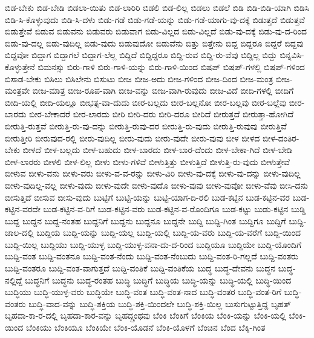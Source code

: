 {ಬಿಡ-ಬೇಕು
ಬಿಡ-ಬೇಡಿ
ಬಿಡಲಾ-ಯಿತು
ಬಿಡ-ಲಾರಿರಿ
ಬಿಡಲಿ
ಬಿಡ-ಲಿಲ್ಲ
ಬಿಡಲು
ಬಿಡಲೆ
ಬಿಡಿ
ಬಿಡಿ-ಬಿಡಿ-ಯಾಗಿ
ಬಿಡಿಸಿ
ಬಿಡಿ-ಸಿ-ಕೊಳ್ಳುವುದು
ಬಿಡಿ-ಸಿ-ದಳು
ಬಿಡು-ಗಡೆ
ಬಿಡು-ಗಡೆ-ಯನ್ನು
ಬಿಡು-ಗಡೆ-ಯಾಗು-ವು-ದಕ್ಕೆ
ಬಿಡುತ್ತದೆ
ಬಿಡುತ್ತವೆ
ಬಿಡುತ್ತೇವೆ
ಬಿಡುವ
ಬಿಡುವನು
ಬಿಡುವರು
ಬಿಡುವಾಗ
ಬಿಡು-ವಿಲ್ಲದ
ಬಿಡು-ವಿಲ್ಲದೆ
ಬಿಡು-ವು-ದಕ್ಕೆ
ಬಿಡು-ವು-ದ-ರಿಂದ
ಬಿಡು-ವು-ದಲ್ಲ
ಬಿಡು-ವುದಿಲ್ಲ
ಬಿಡು-ವುದು
ಬಿಡುವುದೋ
ಬಿಡುವೆನು
ಬಿತ್ತು
ಬಿತ್ತೇನು
ಬಿದ್ದ
ಬಿದ್ದರೂ
ಬಿದ್ದರೆ
ಬಿದ್ದವು
ಬಿದ್ದವೋ
ಬಿದ್ದಾಗ
ಬಿದ್ದಾಗಲೆ
ಬಿದ್ದಾಗ-ಲೆಲ್ಲ
ಬಿದ್ದಿದೆ
ಬಿದ್ದಿದ್ದರೂ
ಬಿದ್ದಿ-ರುವ
ಬಿದ್ದಿ-ರು-ವೆವು
ಬಿದ್ದಿಲ್ಲ
ಬಿದ್ದು
ಬಿನ್ನವಿಸಿ-ಕೊಳ್ಳುತ್ತೇನೆ
ಬಿಮನಸ್ಸು
ಬಿರು-ಗಾಳಿ
ಬಿರು-ಗಾಳಿ-ಯನ್ನು
ಬಿರು-ಗಾಳಿ-ಯಿಂದ
ಬಿಷಪ್
ಬಿಷಪ್-ಗಳಲ್ಲಿ
ಬಿಷಪ್-ಗಳಿಂದ
ಬಿಸಾಡ-ಬೇಕು
ಬಿಸಿಲು
ಬಿಸಿಲೇನು
ಬಿಸುಟು
ಬೀಜ
ಬೀಜ-ಅದು
ಬೀಜ-ಗಳಿಂದ
ಬೀಜ-ದಿಂದ
ಬೀಜ-ಮಂತ್ರ
ಬೀಜ-ಮಂತ್ರವೇ
ಬೀಜ-ಮಾತ್ರ
ಬೀಜ-ರೂಪ-ವಾಗಿ
ಬೀಜ-ವನ್ನು
ಬೀಜ-ವಾಗಿ-ರುವುದು
ಬೀಜ-ವಿದೆ
ಬೀದಿ-ಗಳಲ್ಲಿ
ಬೀದಿಗೆ
ಬೀದಿ-ಯಲ್ಲಿ
ಬೀದಿ-ಯಲ್ಲೂ
ಬೀಭತ್ಸ-ವಾ-ದುದು
ಬೀರ-ಬಲ್ಲದು
ಬೀರ-ಬಲ್ಲನೋ
ಬೀರ-ಬಲ್ಲವು
ಬೀರ-ಬಲ್ಲೆವು
ಬೀರ-ಬಾರದು
ಬೀರ-ಬೇಕಾದರೆ
ಬೀರ-ಲಾರದು
ಬೀರಿ
ಬೀರಿ-ದರು
ಬೀರಿ-ದರೂ
ಬೀರಿದೆ
ಬೀರುತ್ತದೆ
ಬೀರುತ್ತಾ-ಹೋಗಿದೆ
ಬೀರುತ್ತಿ-ರುತ್ತವೆ
ಬೀರುತ್ತಿ-ರು-ವು-ದನ್ನು
ಬೀರುತ್ತಿ-ರುವು-ದರ
ಬೀರುತ್ತಿ-ರು-ವುದು
ಬೀರುತ್ತಿ-ರುವುವು
ಬೀರುತ್ತಿವೆ
ಬೀರುತ್ತೀರಿ
ಬೀರುವುದ-ರಲ್ಲಿ
ಬೀರು-ವುದಿಲ್ಲ
ಬೀರು-ವುದು
ಬೀರು-ವುದೇ
ಬೀರು-ವುವು
ಬೀಳ
ಬೀಳದ
ಬೀಳ-ದಂತಿರ-ಬೇಕು
ಬೀಳದೆ
ಬೀಳ-ಬಲ್ಲದು
ಬೀಳ-ಬಹುದು
ಬೀಳ-ಬಾರದು
ಬೀಳ-ಬಾರ-ದೆಂದು
ಬೀಳ-ಬೇಕಾ-ಗಿದೆ
ಬೀಳ-ಬೇಡಿ
ಬೀಳ-ಲಾರರು
ಬೀಳಲಿ
ಬೀಳ-ಲಿಲ್ಲ
ಬೀಳು
ಬೀಳು-ಗಳಿವೆ
ಬೀಳುತ್ತಿತ್ತು
ಬೀಳುತ್ತಿದೆ
ಬೀಳುತ್ತಿ-ರು-ವುದು
ಬೀಳುತ್ತೇವೆ
ಬೀಳುವ
ಬೀಳು-ವನು
ಬೀಳು-ವರು
ಬೀಳು-ವ-ವ-ರನ್ನು
ಬೀಳು-ವಿರಿ
ಬೀಳು-ವು-ದಕ್ಕೆ
ಬೀಳು-ವು-ದನ್ನು
ಬೀಳು-ವುದಿಲ್ಲ
ಬೀಳು-ವುದಿಲ್ಲ-ವಲ್ಲ
ಬೀಳು-ವುದು
ಬೀಳು-ವುದೇ
ಬೀಳು-ವುದೊ
ಬೀಳು-ವುವು
ಬೀಳು-ವುವೋ
ಬೀಳು-ವೆವು
ಬೀಸಿ-ದನು
ಬೀಸುತ್ತಿದೆ
ಬೀಸುವ
ಬೀಸು-ವುದು
ಬುಟ್ಟಿಗೆ
ಬುಟ್ಟಿ-ಯನ್ನು
ಬುಟ್ಟಿ-ಯಾಗ-ದಿ-ರಲಿ
ಬುಡ-ಕಟ್ಟಿನ
ಬುಡ-ಕಟ್ಟಿನ-ವರ
ಬುಡ-ಕಟ್ಟಿನ-ವರದೇ
ಬುಡ-ಕಟ್ಟಿನ-ವ-ರಿಗೆ
ಬುಡ-ಕಟ್ಟಿನ-ವರು
ಬುಡ-ಕಟ್ಟಿನ-ವ-ರೊಂದಿಗೂ
ಬುಡ-ಕಟ್ಟು
ಬುಡು-ಕಟ್ಟಿನ
ಬುಡ್ಡಿ
ಬುದ್ದ
ಬುದ್ದನ
ಬುದ್ದ-ನಂತಹ
ಬುದ್ದನಿಗೆ
ಬುದ್ದನು
ಬುದ್ದನೂ
ಬುದ್ದನೇ
ಬುದ್ದಿ
ಬುದ್ದಿ-ಗಿಂತ
ಬುದ್ದಿಗೂ
ಬುದ್ದಿಗೆ
ಬುದ್ದಿ-ಜಾಲ-ದಲ್ಲಿ
ಬುದ್ದಿಯ
ಬುದ್ದಿ-ಯನ್ನು
ಬುದ್ದಿ-ಯಲ್ಲ
ಬುದ್ದಿ-ಯಲ್ಲಿ
ಬುದ್ದಿ-ಯ-ವರು
ಬುದ್ದಿ-ಯ-ವರೆಗೆ
ಬುದ್ದಿ-ಯಿಂದ
ಬುದ್ದಿ-ಯಿಲ್ಲ
ಬುದ್ದಿಯು
ಬುದ್ದಿ-ಯುಳ್ಳ
ಬುದ್ದಿ-ಯುಳ್ಳ-ವನಾ-ದು-ದ-ರಿಂದ
ಬುದ್ದಿಯೂ
ಬುದ್ದಿಯೇ
ಬುದ್ದಿ-ಯೊಂದಿಗೆ
ಬುದ್ದಿ-ವಂತ
ಬುದ್ದಿ-ವಂತನೂ
ಬುದ್ದಿ-ವಂತ-ನೆಂದು
ಬುದ್ದಿ-ವಂತ-ನೆಂಬುದು
ಬುದ್ದಿ-ವಂತ-ರಿ-ಗಲ್ಲದೆ
ಬುದ್ದಿ-ವಂತರು
ಬುದ್ದಿ-ವಂತರೂ
ಬುದ್ದಿ-ವಂತ-ವಾಗುತ್ತದೆ
ಬುದ್ದಿ-ವಂತಿಕೆ
ಬುದ್ದಿ-ವಂತಿಕೆಯ
ಬುದ್ಧ
ಬುದ್ಧ-ದೇವನು
ಬುದ್ಧನ
ಬುದ್ಧ-ನಲ್ಲಿದ್ದೆ
ಬುದ್ಧನಿಗೆ
ಬುದ್ಧನು
ಬುದ್ಧ-ರಂತಹ
ಬುದ್ಧಿ
ಬುದ್ಧಿಗೆ
ಬುದ್ಧಿಯ
ಬುದ್ಧಿ-ಯನ್ನು
ಬುದ್ಧಿ-ಯಲ್ಲಿ
ಬುದ್ಧಿ-ಯಿಂದ
ಬುದ್ಧಿಯು
ಬುದ್ಧಿ-ಯುಳ್ಳ-ವರು
ಬುದ್ಧಿಯೇ
ಬುದ್ಧಿ-ವಂತ
ಬುದ್ಧಿ-ವಂತ-ನಾದ
ಬುದ್ಧಿ-ವಂತರ
ಬುದ್ಧಿ-ವಂತ-ರಿಗೆ
ಬುದ್ಧಿ-ವಂತರು
ಬುದ್ಧಿ-ವಾದ-ವನ್ನು
ಬುದ್ಧಿ-ಶಕ್ತಿಯ
ಬುದ್ಧಿ-ಶಕ್ತಿ-ಯಿಂದಲೇ
ಬುದ್ಧಿ-ಶಕ್ತಿ-ಯಿಲ್ಲ
ಬುಸುಗುಟ್ಟುತ್ತಿದ್ದ
ಬೃಹತ್
ಬೃಹದಾ-ಕಾ-ರ-ದಲ್ಲಿ
ಬೃಹದಾ-ಕಾರ-ವನ್ನು
ಬೃಹದ್ಗ್ರಂಥವು
ಬೆಂಕಿ
ಬೆಂಕಿಗೆ
ಬೆಂಕಿಯ
ಬೆಂಕಿ-ಯನ್ನು
ಬೆಂಕಿ-ಯಲ್ಲಿ
ಬೆಂಕಿ-ಯಿಂದ
ಬೆಂಕಿಯು
ಬೆಂಕಿಯೂ
ಬೆಂಕಿಯೇ
ಬೆಂಕಿ-ಯೊಡನೆ
ಬೆಂಕಿ-ಯೊಳಗೆ
ಬೆಂಚಿನ
ಬೆಂದ
ಬೆಕ್ಕಿ-ಗಿಂತ
}
